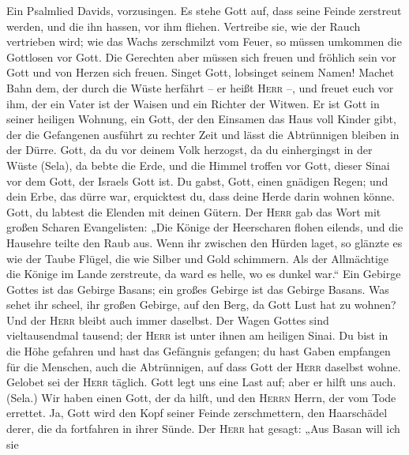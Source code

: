  Ein Psalmlied Davids, vorzusingen.  Es
stehe Gott auf, dass seine Feinde zerstreut werden, und die ihn hassen,
vor ihm fliehen.  Vertreibe sie, wie der Rauch vertrieben
wird; wie das Wachs zerschmilzt vom Feuer, so müssen umkommen die
Gottlosen vor Gott.  Die Gerechten aber müssen sich freuen
und fröhlich sein vor Gott und von Herzen sich freuen. 
Singet Gott, lobsinget seinem Namen! Machet Bahn dem, der durch die
Wüste herfährt -- er heißt \textsc{Herr} --, und freuet euch vor ihm,
 der ein Vater ist der Waisen und ein Richter der Witwen.
Er ist Gott in seiner heiligen Wohnung,  ein Gott, der den
Einsamen das Haus voll Kinder gibt, der die Gefangenen ausführt zu
rechter Zeit und lässt die Abtrünnigen bleiben in der Dürre.
 Gott, da du vor deinem Volk herzogst, da du einhergingst
in der Wüste (Sela),  da bebte die Erde, und die Himmel
troffen vor Gott, dieser Sinai vor dem Gott, der Israels Gott ist.
 Du gabst, Gott, einen gnädigen Regen; und dein Erbe, das
dürre war, erquicktest du,  dass deine Herde darin wohnen
könne. Gott, du labtest die Elenden mit deinen Gütern. 
Der \textsc{Herr} gab das Wort mit großen Scharen Evangelisten:
 „Die Könige der Heerscharen flohen eilends, und die
Hausehre teilte den Raub aus.  Wenn ihr zwischen den
Hürden laget, so glänzte es wie der Taube Flügel, die wie Silber und
Gold schimmern.  Als der Allmächtige die Könige im Lande
zerstreute, da ward es helle, wo es dunkel war.``  Ein
Gebirge Gottes ist das Gebirge Basans; ein großes Gebirge ist das
Gebirge Basans.  Was sehet ihr scheel, ihr großen
Gebirge, auf den Berg, da Gott Lust hat zu wohnen? Und der \textsc{Herr}
bleibt auch immer daselbst.  Der Wagen Gottes sind
vieltausendmal tausend; der \textsc{Herr} ist unter ihnen am heiligen
Sinai.  Du bist in die Höhe gefahren und hast das
Gefängnis gefangen; du hast Gaben empfangen für die Menschen, auch die
Abtrünnigen, auf dass Gott der \textsc{Herr} daselbst wohne.
 Gelobet sei der \textsc{Herr} täglich. Gott legt uns
eine Last auf; aber er hilft uns auch. (Sela.)  Wir haben
einen Gott, der da hilft, und den \textsc{Herrn} Herrn, der vom Tode
errettet.  Ja, Gott wird den Kopf seiner Feinde
zerschmettern, den Haarschädel derer, die da fortfahren in ihrer Sünde.
 Der \textsc{Herr} hat gesagt: „Aus Basan will ich sie
